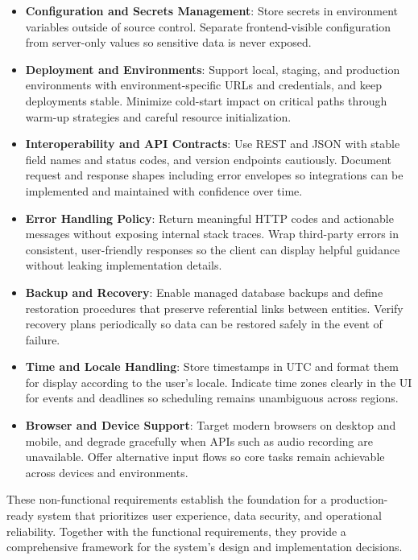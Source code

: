 \documentclass[12pt,a4paper]{article}
\begin{document}
\begin{itemize}
  \item \textbf{Configuration and Secrets Management}: Store secrets in environment variables outside of source control. Separate frontend-visible configuration from server-only values so sensitive data is never exposed.

  \item \textbf{Deployment and Environments}: Support local, staging, and production environments with environment-specific URLs and credentials, and keep deployments stable. Minimize cold-start impact on critical paths through warm-up strategies and careful resource initialization.

  \item \textbf{Interoperability and API Contracts}: Use REST and JSON with stable field names and status codes, and version endpoints cautiously. Document request and response shapes including error envelopes so integrations can be implemented and maintained with confidence over time.

  \item \textbf{Error Handling Policy}: Return meaningful HTTP codes and actionable messages without exposing internal stack traces. Wrap third-party errors in consistent, user-friendly responses so the client can display helpful guidance without leaking implementation details.

  \item \textbf{Backup and Recovery}: Enable managed database backups and define restoration procedures that preserve referential links between entities. Verify recovery plans periodically so data can be restored safely in the event of failure.

  \item \textbf{Time and Locale Handling}: Store timestamps in UTC and format them for display according to the user's locale. Indicate time zones clearly in the UI for events and deadlines so scheduling remains unambiguous across regions.

  \item \textbf{Browser and Device Support}: Target modern browsers on desktop and mobile, and degrade gracefully when APIs such as audio recording are unavailable. Offer alternative input flows so core tasks remain achievable across devices and environments.
\end{itemize}

These non-functional requirements establish the foundation for a production-ready system that prioritizes user experience, data security, and operational reliability. Together with the functional requirements, they provide a comprehensive framework for the system's design and implementation decisions.
\end{document}
